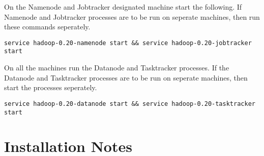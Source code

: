 \documentclass[11pt]{article}
\begin{document}
On the Namenode and Jobtracker designated machine start the following.
If Namenode and Jobtracker processes are to be run on seperate machines,
then run these commands seperately.

\begin{verbatim}
service hadoop-0.20-namenode start && service hadoop-0.20-jobtracker start
\end{verbatim}

On all the machines run the Datanode and Tasktracker processes. If the
Datanode and Tasktracker processes are to be run on seperate machines,
then start the processes seperately.

\begin{verbatim}
service hadoop-0.20-datanode start && service hadoop-0.20-tasktracker start
\end{verbatim}

\section{Installation Notes}

\end{document}
